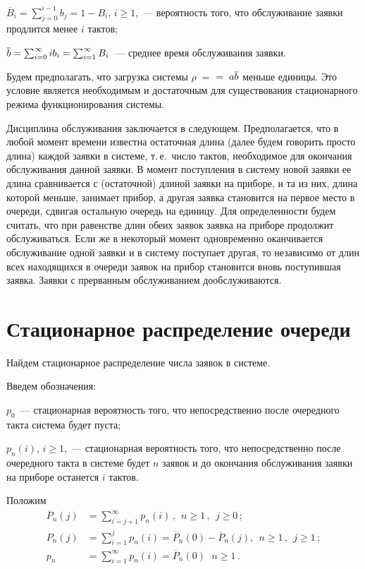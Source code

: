 \begin{multicols}{2}
$\overline B_i=\sum_{j=0}^{i-1} b_j = 1-B_i$,  $i\ge 1$,~---
вероятность того, что обслуживание заявки продлится менее $i$
тактов;

$\overline b = \sum_{i=0}^\infty i b_i = \sum_{i=1}^\infty B_i$~---
среднее время обслуживания заявки.

Будем предполагать, что загрузка системы $\rho\;=$ $=\;a\overline b$ меньше единицы. Это 
условие является необходимым и достаточным для существования стационарного 
режима функционирования системы.



Дисциплина обслуживания заключается в следующем.
Предполагается, что в любой момент времени известна остаточная
длина (далее будем говорить просто длина) каждой заявки в
системе, т.\,е.\ число тактов, необходимое для окончания
обслуживания данной заявки.
В момент поступления в систему новой заявки ее длина
сравнивается с (остаточной) длиной заявки на приборе, и та
из них, длина которой меньше, занимает прибор, а другая
заявка становится на первое место в очереди, сдвигая остальную
очередь на единицу.
Для определенности будем считать, что при равенстве длин
обеих заявок заявка на приборе продолжит обслуживаться.
Если же в некоторый момент одновременно оканчивается
обслуживание одной заявки и в систему поступает другая,
то независимо от длин всех находящихся в очереди заявок
на прибор становится вновь поступившая заявка.
Заявки с прерванным обслуживанием дообслуживаются.

\section{Стационарное распределение очереди}

Найдем стационарное распределение числа заявок в системе.

Введем обозначения:

$p_{0}$~--- стационарная вероятность того, что непосредственно
после очередного такта система будет пуста;

$p_{n}(i)$,  $i\ge 1$,~--- стационарная вероятность того,
что непосредственно после очередного такта в сис\-те\-ме
будет $n$ заявок и до окончания обслуживания заявки на приборе
останется $i$ тактов.

Положим
\begin{align*}
\overline P_{n}(j) & =
\sum\limits_{i=j+1}^\infty
p_{n}(i)\,, \ \ n\ge 1\,,\ \ j\ge 0\,;
\\
P_{n}(j) & = \sum\limits_{i=1}^j
p_{n}(i)     =
\overline P_{n}(0) - \overline P_{n}(j),
\ \ n\ge 1\,,\ \ j\ge 1\,;
\\
p_{n} &=
\sum\limits_{i=1}^\infty
p_{n}(i) = \overline P_{n}(0)\,
\ \ n\ge 1\,.
\end{align*}


\end{multicols}
